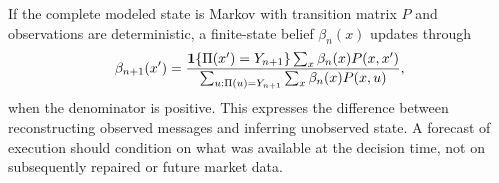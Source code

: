 If the complete modeled state is Markov with transition matrix $P$ and observations are deterministic, a finite-state belief $\beta_n(x)$ updates through
\begin{equation}
 \beta_{n+1}(x')=
 \frac{\mathbf 1\{\Pi(x')=Y_{n+1}\}\sum_x\beta_n(x)P(x,x')}
 {\sum_{u:\Pi(u)=Y_{n+1}}\sum_x\beta_n(x)P(x,u)},
\label{eq:filter}
\end{equation}
when the denominator is positive. This expresses the difference between reconstructing observed messages and inferring unobserved state. A forecast of execution should condition on what was available at the decision time, not on subsequently repaired or future market data.
